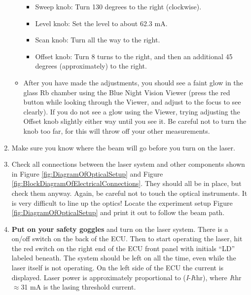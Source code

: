 \documentclass{../lab}
\begin{document}
\begin{enumerate}
\begin{itemize}
        \begin{itemize}
            \item Sweep knob: Turn 130 degrees to the right (clockwise).
    
            \item Level knob: Set the level to about 62.3 mA.
    
            \item Scan knob: Turn all the way to the right.
    
            \item Offset knob: Turn 8 turns to the right, and then an additional 45 degrees (approximately) to the right.
        \end{itemize}

\newpage

        \item After you have made the adjustments, you should see a faint glow in the glass Rb chamber using the Blue Night Vision Viewer (press the red button while looking through the Viewer, and adjust to the focus to see clearly). If you do not see a glow using the Viewer, trying adjusting the Offset knob slightly either way until you see it. Be careful not to turn the knob too far, for this will throw off your other measurements.
    \end{itemize}
    
    \item Make sure you know where the beam will go before you turn on the laser.

    \item Check all connections between the laser system and other components shown in Figure \ref{fig:DiagramOfOpticalSetup} and Figure \ref{fig:BlockDiagramOfElectricalConnections}. They should all be in place, but check them anyway. Again, be careful not to touch the optical instruments. It is very difficult to line up the optics! Locate the experiment setup Figure \ref{fig:DiagramOfOpticalSetup} and print it out to follow the beam path.
    
    \item \textbf{Put on your safety goggles} and turn on the laser system. There is a on/off switch on the back of the ECU. Then to start operating the laser, hit the red switch on the right end of the ECU front panel with initials ``LD'' labeled beneath. The system should be left on all the time, even while the laser itself is not operating. On the left side of the ECU the current is displayed. Laser power is approximately proportional to (\emph{I}-\emph{I}thr), where \emph{I}thr$\approx$31 mA is the lasing threshold current.
    

\end{enumerate}
\end{document}
